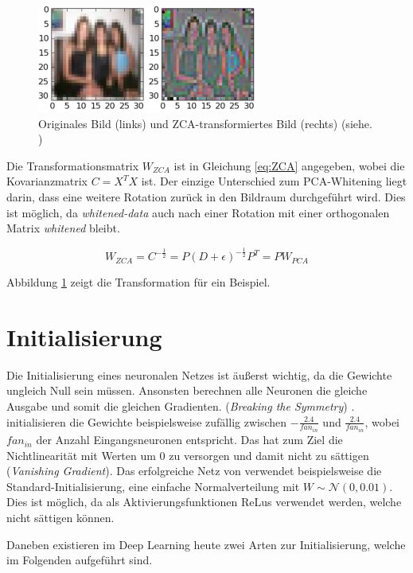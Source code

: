 \begin{figure}[H]
\centering
\includegraphics[width=0.5\linewidth]{images/4_ZCA}
\caption[]{Originales Bild (links) und ZCA-transformiertes Bild (rechts) (siehe. \cite{Krizhevsky2009})}
\label{fig:4_ZCA}
\end{figure}

Die Transformationsmatrix $W_{ZCA}$ ist in Gleichung \ref{eq:ZCA} angegeben, wobei die Kovarianzmatrix $C = X^TX$ ist. Der einzige Unterschied zum PCA-Whitening liegt darin, dass eine weitere Rotation zurück in den Bildraum durchgeführt wird. Dies ist möglich, da \textit{whitened-data} auch nach einer Rotation mit einer orthogonalen Matrix \textit{whitened} bleibt.

\begin{equation}
\label{eq:ZCA} 
W_{ZCA} = C^{-\frac{1}{2}} = P(D+\epsilon)^{-\frac{1}{2}}P^T = PW_{PCA}
\end{equation}

Abbildung \ref{fig:4_ZCA} zeigt die Transformation für ein Beispiel.


\section{Initialisierung}
Die Initialisierung eines neuronalen Netzes ist äußerst wichtig, da die Gewichte ungleich Null sein müssen. Ansonsten berechnen alle Neuronen die gleiche Ausgabe und somit die gleichen Gradienten. (\textit{Breaking the Symmetry}) \cite[vgl.][S. 201]{Rojas1996}.
\cite{LeCun1989} initialisieren die Gewichte beispielsweise zufällig zwischen $-\frac{2.4}{fan_{in}}$ und $\frac{2.4}{fan_{in}}$, wobei $fan_{in}$ der Anzahl Eingangsneuronen entspricht. Das hat zum Ziel die Nichtlinearität mit Werten um $0$ zu versorgen und damit nicht zu sättigen (\textit{Vanishing Gradient}).
Das erfolgreiche Netz von \cite{Krizhevsky2012} verwendet beispielsweise die Standard-Initialisierung, eine einfache Normalverteilung mit $W \sim \mathcal{N} (0,0.01)$. Dies ist möglich, da als Aktivierungsfunktionen ReLus verwendet werden, welche nicht sättigen können. 

Daneben existieren im Deep Learning heute zwei Arten zur Initialisierung, welche im Folgenden aufgeführt sind. 

